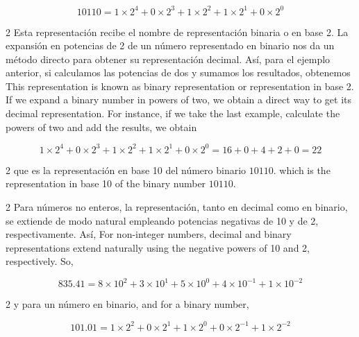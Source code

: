 \begin{equation*}
10110 = 1\times2^4+0\times2^3+1\times2^2+1\times2^1+0\times2^0
\end{equation*}
\begin{paracol}{2}
Esta representación recibe el nombre de representación binaria o en base 2.
La expansión en potencias de 2 de un número representado en binario nos da un método directo para obtener su representación decimal. Así, para el ejemplo anterior, si calculamos las potencias de dos y sumamos los resultados, obtenemos
\switchcolumn
This representation is known as binary representation or representation in base 2.  If we expand a binary number in powers of two, we obtain a direct way to get its decimal representation. For instance, if we take the last example, calculate the powers of two and add the results, we obtain
\end{paracol}
  \begin{equation*} 1\times2^4+0\times2^3+1\times2^2+1\times2^1+0\times2^0=16+0+4+2+0=22
\end{equation*}
\begin{paracol}{2}
que es la representación en base 10 del número binario $10110$.
\switchcolumn
which is the representation in base 10 of the binary number $10110$.
\end{paracol}
\begin{paracol}{2}
Para números no enteros, la representación, tanto en decimal como en binario, se extiende de modo natural empleando potencias negativas de 10 y de 2, respectivamente. Así,
\switchcolumn
For non-integer numbers, decimal and binary representations extend naturally using the negative powers of 10 and 2, respectively. So,
\end{paracol}
\begin{equation*}
835.41 = 8\times10^2+3\times10^1+5\times10^0+4\times10^{-1}+1\times10^{-2}
\end{equation*}
\begin{paracol}{2}
y para un número en binario,
\switchcolumn
and for a binary number,
\end{paracol}

\begin{equation*}
101.01 = 1\times2^2+0\times2^1+1\times2^0+0\times2^{-1}+1\times2^{-2}
\end{equation*}

